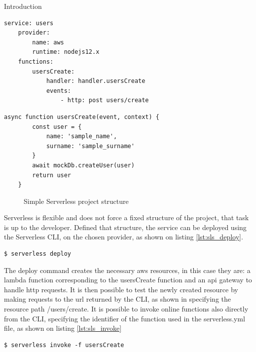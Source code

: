 \begin{chapter}{Introduction}

    \begin{lstlisting}[caption=Simple serverless.yml file, label={lst:simple_sls_yml}]
    service: users
    provider:
        name: aws
        runtime: nodejs12.x
    functions:
        usersCreate:
            handler: handler.usersCreate
            events:
                - http: post users/create
    \end{lstlisting}

    \begin{lstlisting}[caption=Simple handler function, label={lst:handler_fun}]
    async function usersCreate(event, context) {
        const user = {
            name: 'sample_name',
            surname: 'sample_surname'
        }
        await mockDb.createUser(user)
        return user
    }
    \end{lstlisting}


    \begin{figure}
        \caption{Simple Serverless project structure}
        \label{fig:sls_project_structure}
        \begin{minipage}{\linewidth}
        \end{minipage}
    \end{figure}

    Serverless is flexible and does not force a fixed structure of the project, that
    task is up to the developer.
    Defined that structure, the service can be deployed using the Serverless CLI, on
    the chosen provider, as shown on listing \ref{lst:sls_deploy}.
    \begin{lstlisting}[caption=Deploy command, label={lst:sls_deploy}]
        $ serverless deploy
    \end{lstlisting}
    The deploy command creates the necessary aws resources, in this case they are:
    a lambda function corresponding to the usersCreate function and an api gateway to
    handle http requests.
    It is then possible to test the newly created resource by making requests to the
    url returned by the CLI, as shown in %
    specifying the resource path /users/create.
    It is possible to invoke online functions also directly from the CLI,
    specifying the identifier of the function used in the serverless.yml file, as shown
    on listing \ref{lst:sls_invoke}
    \begin{lstlisting}[caption=Invoke command, label={lst:sls_invoke}]
    $ serverless invoke -f usersCreate
    \end{lstlisting}


\end{chapter}
